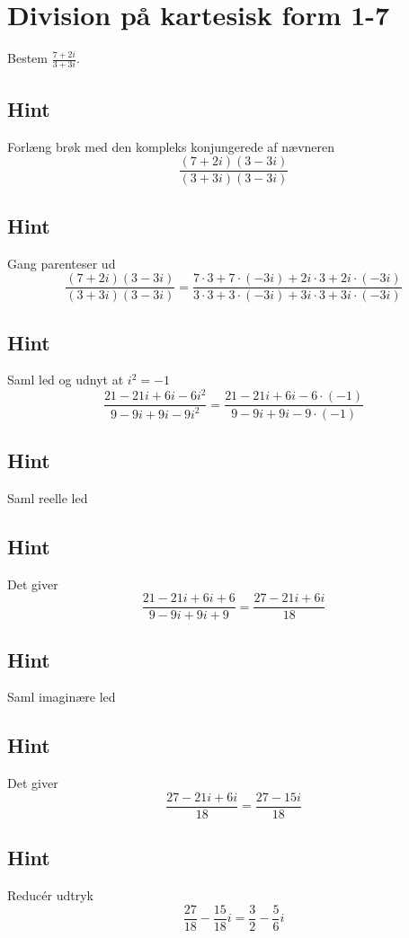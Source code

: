 \documentclass{article}
\newenvironment{exercise}[1]{\newpage\section{#1}}{}
\newcommand{\answerbox}[1]{\fbox{$#1$}}
\newcommand{\hint}{\subsection*{Hint}}
\begin{document}
\begin{exercise}{Division på kartesisk form 1-7}
	
	Bestem $\frac{7+2i}{3+3i}$.
	
	\answerbox{\frac{3}{2} - \frac{5}{6}i}
	
	
	\hint 
	
	Forlæng brøk med den kompleks konjungerede af nævneren
	\[
	\frac{(7+2i)(3-3i)}{(3+3i)(3-3i)}
	\]
	
	\hint
	
	Gang parenteser ud
	\[
	\frac{(7+2i)(3-3i)}{(3+3i)(3-3i)} = \frac{7 \cdot 3 + 7 \cdot (-3i)+2i \cdot 3 + 2i \cdot (-3i)}{3 \cdot 3 + 3 \cdot (-3i) + 3i \cdot 3 + 3i \cdot (-3i)}
	\]
	
	\hint 
	
	Saml led og udnyt at $i^2 = -1$
	\[
	\frac{21 -21i +6i - 6i^2}{9 -9 i +9i-9i^2} = \frac{21 -21i +6i - 6 \cdot (-1)}{9 -9 i +9i-9 \cdot (-1)}
	\]
	
	\hint
	
	Saml reelle led
	
	\hint
	
	Det giver
	\[
	\frac{21 -21i +6i + 6 }{9 -9 i +9i+9} = \frac{27 -21i+6i}{18}
	\]
	
	\hint
	
	Saml imaginære led
	
	
	\hint
	
	Det giver 
	\[
	\frac{27 -21i+6i}{18} = \frac{27-15i}{18}
	\]
	
	\hint
	
	Reducér udtryk
	\[
	\frac{27}{18} - \frac{15}{18}i = \frac{3}{2} - \frac{5}{6}i
	\]
	
\end{exercise}

\newpage
\end{document}
